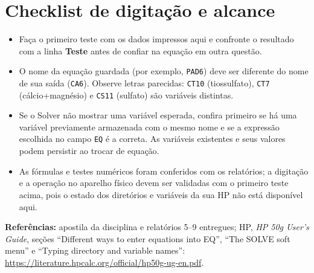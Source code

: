\documentclass[11pt,a4paper]{article}
\begin{document}
\section*{Checklist de digitação e alcance}
\begin{itemize}
\item Faça o primeiro teste com os dados impressos aqui e confronte o resultado com a linha \textbf{Teste} antes de confiar na equação em outra questão.
\item O nome da equação guardada (por exemplo, \texttt{PAD6}) deve ser diferente do nome de sua saída (\texttt{CA6}). Observe letras parecidas: \texttt{CT10} (tiossulfato), \texttt{CT7} (cálcio+magnésio) e \texttt{CS11} (sulfato) são variáveis distintas.
\item Se o Solver não mostrar uma variável esperada, confira primeiro se há uma variável previamente armazenada com o mesmo nome e se a expressão escolhida no campo \texttt{EQ} é a correta. As variáveis existentes e seus valores podem persistir ao trocar de equação.
\item As fórmulas e testes numéricos foram conferidos com os relatórios; a digitação e a operação no aparelho físico devem ser validadas com o primeiro teste acima, pois o estado dos diretórios e variáveis da sua HP não está disponível aqui.
\end{itemize}
\noindent\textbf{Referências:} apostila da disciplina e relatórios 5--9 entregues; HP, \emph{HP 50g User's Guide}, seções ``Different ways to enter equations into EQ'', ``The SOLVE soft menu'' e ``Typing directory and variable names'': \url{https://literature.hpcalc.org/official/hp50g-ug-en.pdf}.
\end{document}
